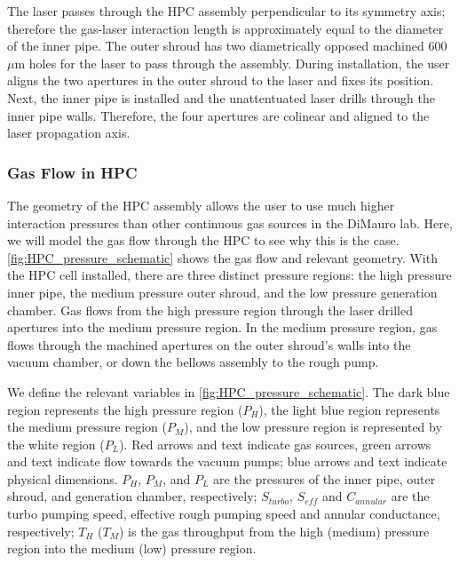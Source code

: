The laser passes through the HPC assembly perpendicular to its symmetry axis; therefore the gas-laser interaction length is approximately equal to the diameter of the inner pipe. The outer shroud has two diametrically opposed machined 600 $\mu$m holes for the laser to pass through the assembly. During installation, the user aligns the two apertures in the outer shroud to the laser and fixes its position. Next, the inner pipe is installed and the unattentuated laser drills through the inner pipe walls. Therefore, the four apertures are colinear and aligned to the laser propagation axis.

\subsubsection{Gas Flow in HPC}

The geometry of the HPC assembly allows the user to use much higher interaction pressures than other continuous gas sources in the DiMauro lab. Here, we will model the gas flow through the HPC to see why this is the case. \cref{fig:HPC_pressure_schematic} shows the gas flow and relevant geometry. With the HPC cell installed, there are three distinct pressure regions: the high pressure inner pipe, the medium pressure outer shroud, and the low pressure generation chamber. Gas flows from the high pressure region through the laser drilled apertures into the medium pressure region. In the medium pressure region, gas flows through the machined apertures on the outer shroud's walls into the vacuum chamber, or down the bellows assembly to the rough pump.

We define the relevant variables in \cref{fig:HPC_pressure_schematic}. The dark blue region represents the high pressure region ($P_H$), the light blue region represents the medium pressure region ($P_M$), and the low pressure region is represented by the white region ($P_L$). Red arrows and text indicate gas sources, green arrows and text indicate flow towards the vacuum pumps; blue arrows and text indicate physical dimensions. $P_H$, $P_M$, and $P_L$ are the pressures of the inner pipe, outer shroud, and generation chamber, respectively; $S_{turbo}$, $S_{eff}$ and $C_{annular}$ are the turbo pumping speed, effective rough pumping speed and annular conductance, respectively; $T_H$ ($T_M$) is the gas throughput from the high (medium) pressure region into the medium (low) pressure region.

